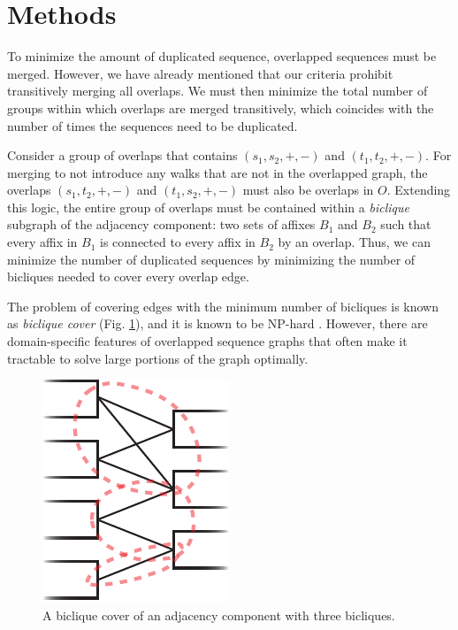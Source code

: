 \documentclass[11pt]{ucthesis}
\newcommand{\figref}[1]{Fig. \ref{fig:#1}}
\begin{document}
\section{Methods}

To minimize the amount of duplicated sequence, overlapped sequences must be merged. 
However, we have already mentioned that our criteria prohibit transitively merging all overlaps.
We must then minimize the total number of groups within which overlaps are merged transitively, which coincides with the number of times the sequences need to be duplicated.

Consider a group of overlaps that contains $(s_1, s_2, +, -)$ and $(t_1, t_2, +, -)$.
For merging to not introduce any walks that are not in the overlapped graph, the overlaps $(s_1, t_2, +, -)$ and $(t_1, s_2, +, -)$ must also be overlaps in $O$.
Extending this logic, the entire group of overlaps must be contained within a \emph{biclique} subgraph of the adjacency component: two sets of affixes $B_1$ and $B_2$ such that every affix in $B_1$ is connected to every affix in $B_2$ by an overlap.
Thus, we can minimize the number of duplicated sequences by minimizing the number of bicliques needed to cover every overlap edge.

The problem of covering edges with the minimum number of bicliques is known as \emph{biclique cover} (\figref{biclique}), and it is known to be NP-hard \cite{orlin1977contentment}.
However, there are domain-specific features of overlapped sequence graphs that often make it tractable to solve large portions of the graph optimally.

\begin{figure}
\begin{center}
\includegraphics[width=.2\textwidth]{bluntfigures/biclique_cover.pdf}
\caption{A biclique cover of an adjacency component with three bicliques.} \label{fig:biclique}
\end{center}
\end{figure}
\end{document}
